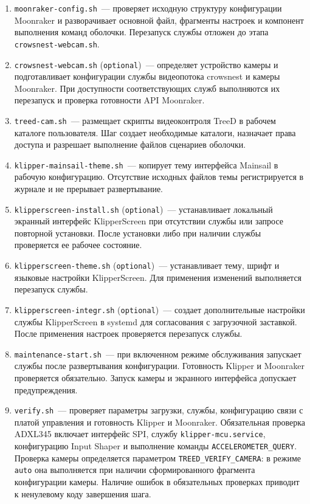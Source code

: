 \begin{enumerate}
\item \texttt{moonraker-config.sh}~--- проверяет исходную структуру конфигурации Moonraker и разворачивает основной файл, фрагменты настроек и компонент выполнения команд оболочки. Перезапуск службы отложен до этапа \texttt{crowsnest-webcam.sh}.
\item \texttt{crowsnest-webcam.sh} (\texttt{optional})~--- определяет устройство камеры и подготавливает конфигурации службы видеопотока crowsnest и камеры Moonraker. При доступности соответствующих служб выполняются их перезапуск и проверка готовности API Moonraker.
\item \texttt{treed-cam.sh}~--- размещает скрипты видеоконтроля TreeD в рабочем каталоге пользователя. Шаг создает необходимые каталоги, назначает права доступа и разрешает выполнение файлов сценариев оболочки.
\item \texttt{klipper-mainsail-theme.sh}~--- копирует тему интерфейса Mainsail в рабочую конфигурацию. Отсутствие исходных файлов темы регистрируется в журнале и не прерывает развертывание.
\item \texttt{klipperscreen-install.sh} (\texttt{optional})~--- устанавливает локальный экранный интерфейс KlipperScreen при отсутствии службы или запросе повторной установки. После установки либо при наличии службы проверяется ее рабочее состояние.
\item \texttt{klipperscreen-theme.sh} (\texttt{optional})~--- устанавливает тему, шрифт и языковые настройки KlipperScreen. Для применения изменений выполняется перезапуск службы.
\item \texttt{klipperscreen-integr.sh} (\texttt{optional})~--- создает дополнительные настройки службы KlipperScreen в systemd для согласования с загрузочной заставкой. После применения настроек проверяется перезапуск службы.
\item \texttt{maintenance-start.sh}~--- при включенном режиме обслуживания запускает службы после развертывания конфигурации. Готовность Klipper и Moonraker проверяется обязательно. Запуск камеры и экранного интерфейса допускает предупреждения.
\item \texttt{verify.sh}~--- проверяет параметры загрузки, службы, конфигурацию связи с платой управления и готовность Klipper и Moonraker. Обязательная проверка ADXL345 включает интерфейс SPI, службу \texttt{klipper-mcu.service}, конфигурацию Input Shaper и выполнение команды \texttt{ACCELEROMETER\_QUERY}. Проверка камеры определяется параметром \texttt{TREED\_VERIFY\_CAMERA}: в режиме \texttt{auto} она выполняется при наличии сформированного фрагмента конфигурации камеры. Наличие ошибок в обязательных проверках приводит к ненулевому коду завершения шага.
\end{enumerate}

